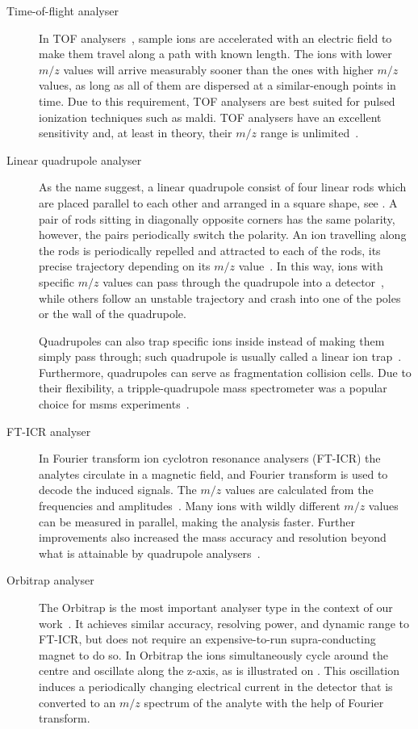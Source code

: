 \begin{description}
  \item[Time-of-flight analyser] In TOF analysers~\cite{stephens1946pulsed}, sample ions are accelerated with an electric field to make them travel along a path with known length. The ions with lower \(m/z\) values will arrive measurably sooner than the ones with higher \(m/z\) values, as long as all of them are dispersed at a similar-enough points in time. Due to this requirement, TOF analysers are best suited for pulsed ionization techniques such as \gls*{maldi}\@. TOF analysers have an excellent sensitivity and, at least in theory, their \(m/z\) range is unlimited~\cite{fuerstenau1995molecular}.
  \item[Linear quadrupole analyser] As the name suggest, a linear quadrupole consist of four linear rods which are placed parallel to each other and arranged in a square shape, see . A pair of rods sitting in diagonally opposite corners has the same polarity, however, the pairs periodically switch the polarity. An ion travelling along the rods is periodically repelled and attracted to each of the rods, its precise trajectory depending on its \(m/z\) value~\cite{paul1990electromagnetic}. In this way, ions with specific \(m/z\) values can pass through the quadrupole into a detector~\cite{paul1953neues}, while others follow an unstable trajectory and crash into one of the poles or the wall of the quadrupole.

    Quadrupoles can also trap specific ions inside instead of making them simply pass through; such quadrupole is usually called a linear ion trap~\cite{mao2003h}. Furthermore, quadrupoles can serve as fragmentation collision cells. Due to their flexibility, a tripple-quadrupole mass spectrometer was a popular choice for \gls*{msms} experiments~\cite{yost1978selected}.
  \item[FT-ICR analyser] In Fourier transform ion cyclotron resonance analysers (FT-ICR) the analytes circulate in a magnetic field, and Fourier transform is used to decode the induced signals. The \(m/z\) values are calculated from the frequencies and amplitudes~\cite{comisarow1974fourier}. Many ions with wildly different \(m/z\) values can be measured in parallel, making the analysis faster. Further improvements also increased the mass accuracy and resolution beyond what is attainable by quadrupole analysers~\cite{amster1996fourier, easterling1999routine}.
  \item[Orbitrap analyser] The Orbitrap is the most important analyser type in the context of our work~\cite{hu2005orbitrap}. It achieves similar accuracy, resolving power, and dynamic range to FT-ICR, but does not require an expensive-to-run supra-conducting magnet to do so. In Orbitrap the ions simultaneously cycle around the centre and oscillate along the z-axis, as is illustrated on . This oscillation induces a periodically changing electrical current in the detector that is converted to an \(m/z\) spectrum of the analyte with the help of Fourier transform.


\end{description}
